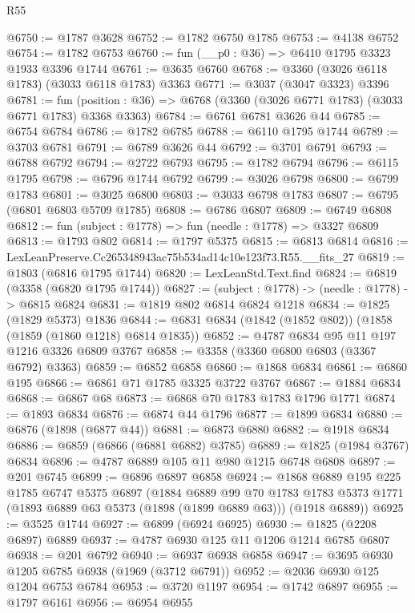 \begin{lexlean}{R55}
\begin{coremodule}
@6750 := @1787 @3628
@6752 := @1782 @6750 @1785
@6753 := @4138 @6752
@6754 := @1782 @6753
@6760 := fun (__p0 : @36) => @6410 @1795 @3323 @1933 @3396 @1744
@6761 := @3635 @6760
@6768 := @3360 (@3026 @6118 @1783) (@3033 @6118 @1783) @3363
@6771 := @3037 (@3047 @3323) @3396
@6781 := fun (position : @36) => @6768 (@3360 (@3026 @6771 @1783) (@3033 @6771 @1783) @3368 @3363)
@6784 := @6761 @6781 @3626 @44
@6785 := @6754 @6784
@6786 := @1782 @6785
@6788 := @6110 @1795 @1744
@6789 := @3703 @6781
@6791 := @6789 @3626 @44
@6792 := @3701 @6791
@6793 := @6788 @6792
@6794 := @2722 @6793
@6795 := @1782 @6794
@6796 := @6115 @1795
@6798 := @6796 @1744 @6792
@6799 := @3026 @6798
@6800 := @6799 @1783
@6801 := @3025 @6800
@6803 := @3033 @6798 @1783
@6807 := @6795 (@6801 @6803 @5709 @1785)
@6808 := @6786 @6807
@6809 := @6749 @6808
@6812 := fun (subject : @1778) => fun (needle : @1778) => @3327 @6809
@6813 := @1793 @802
@6814 := @1797 @5375
@6815 := @6813 @6814
@6816 := LexLeanPreserve.Cc265348943ac75b534ad14c10e123f73.R55.__fits_27
@6819 := @1803 (@6816 @1795 @1744)
@6820 := LexLeanStd.Text.find
@6824 := @6819 (@3358 (@6820 @1795 @1744))
@6827 := (subject : @1778) -> (needle : @1778) -> @6815 @6824
@6831 := @1819 @802 @6814 @6824 @1218
@6834 := @1825 (@1829 @5373) @1836
@6844 := @6831 @6834 (@1842 (@1852 @802)) (@1858 (@1859 (@1860 @1218) @6814 @1835))
@6852 := @4787 @6834 @95 @11 @197 @1216 @3326 @6809 @3767
@6858 := @3358 (@3360 @6800 @6803 (@3367 @6792) @3363)
@6859 := @6852 @6858
@6860 := @1868 @6834
@6861 := @6860 @195
@6866 := @6861 @71 @1785 @3325 @3722 @3767
@6867 := @1884 @6834
@6868 := @6867 @68
@6873 := @6868 @70 @1783 @1783 @1796 @1771
@6874 := @1893 @6834
@6876 := @6874 @44 @1796
@6877 := @1899 @6834
@6880 := @6876 (@1898 (@6877 @44))
@6881 := @6873 @6880
@6882 := @1918 @6834
@6886 := @6859 (@6866 (@6881 @6882) @3785)
@6889 := @1825 (@1984 @3767) @6834
@6896 := @4787 @6889 @105 @11 @980 @1215 @6748 @6808
@6897 := @201 @6745
@6899 := @6896 @6897 @6858
@6924 := @1868
    @6889
    @195
    @225
    @1785
    @6747
    @5375
    @6897
    (@1884
      @6889
      @99
      @70
      @1783
      @1783
      @5373
      @1771
      (@1893 @6889 @63 @5373 (@1898 (@1899 @6889 @63)))
      (@1918 @6889))
@6925 := @3525 @1744
@6927 := @6899 (@6924 @6925)
@6930 := @1825 (@2208 @6897) @6889
@6937 := @4787 @6930 @125 @11 @1206 @1214 @6785 @6807
@6938 := @201 @6792
@6940 := @6937 @6938 @6858
@6947 := @3695 @6930 @1205 @6785 @6938 (@1969 (@3712 @6791))
@6952 := @2036 @6930 @125 @1204 @6753 @6784
@6953 := @3720 @1197
@6954 := @1742 @6897
@6955 := @1797 @6161
@6956 := @6954 @6955

\end{coremodule}
\end{lexlean}
